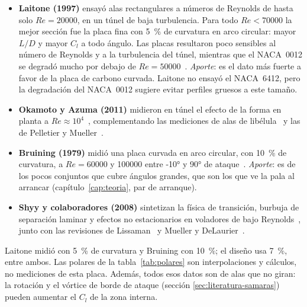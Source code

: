 \begin{itemize}
  \item \textbf{Laitone (1997)} ensayó alas rectangulares a números de Reynolds de hasta
        solo $Re=\num{20000}$, en un túnel de baja turbulencia. Para
        todo $Re<\num{70000}$ la mejor sección fue la placa fina con \SI{5}{\percent} de
        curvatura en arco circular: mayor $L/D$ y mayor $C_l$ a todo ángulo. Las placas
        resultaron poco sensibles al número de Reynolds y a la turbulencia del túnel,
        mientras que el NACA~0012 se degradó mucho por debajo de
        $Re=\num{50000}$~\cite{literatura-laitone1997}. \emph{Aporte}: es el dato más
        fuerte a favor de la placa de carbono curvada. Laitone no ensayó el NACA~6412,
        pero la degradación del NACA~0012 sugiere evitar perfiles gruesos a este tamaño.
  \item \textbf{Okamoto y Azuma (2011)} midieron en túnel el efecto de la forma en planta
        a $Re\approx10^4$~\cite{literatura-okamoto2011}, complementando las mediciones de alas de
        libélula~\cite{okamoto1996} y las de Pelletier y Mueller~\cite{pelletier2000}.
  \item \textbf{Bruining (1979)} midió una placa curvada en arco circular, con
        \SI{10}{\percent} de curvatura, a $Re=\num{60000}$ y \num{100000} entre \ang{-10}
        y \ang{90} de ataque~\cite{literatura-bruining1979}. \emph{Aporte}: es de los
        pocos conjuntos que cubre ángulos grandes, que son los que ve la pala al
        arrancar (capítulo~\ref{cap:teoria}, par de arranque).
  \item \textbf{Shyy y colaboradores (2008)} sintetizan la física de transición, burbuja
        de separación laminar y efectos no estacionarios en voladores de bajo
        Reynolds~\cite{literatura-shyy2008}, junto con las revisiones de
        Lissaman~\cite{lissaman1983} y Mueller y DeLaurier~\cite{mueller2003}.
\end{itemize}

\begin{nota}
Laitone midió con \SI{5}{\percent} de curvatura y Bruining con \SI{10}{\percent}; el
diseño usa \SI{7}{\percent}, entre ambos. Las polares de la tabla~\ref{tab:polares} son
interpolaciones y cálculos, no mediciones de esta placa. Además, todos esos datos son de
alas que no giran: la rotación y el vórtice de borde de ataque (sección
\ref{sec:literatura-samaras}) pueden aumentar el $C_l$ de la zona interna.
\end{nota}

